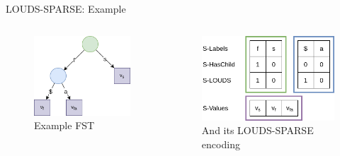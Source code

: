 \documentclass{beamer}
\begin{document}
\begin{frame}{LOUDS-SPARSE: Example}
		\begin{columns}
				\begin{figure}
						\centering
						\includegraphics[width=\textwidth]{resources/louds_trie}
						\caption{Example FST}
				\end{figure}
				\begin{figure}
						\centering
						\includegraphics[width=\textwidth]{resources/louds_sparse}
						\caption{And its LOUDS-SPARSE encoding}
				\end{figure}
		\end{columns}
\end{frame}
\end{document}
